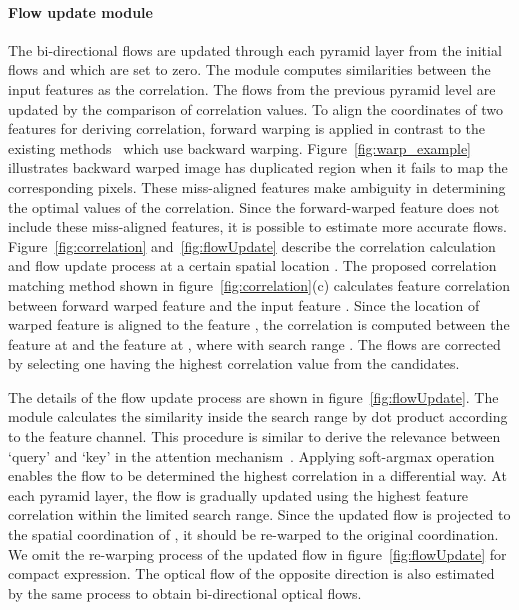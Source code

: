 \documentclass[10pt,twocolumn,letterpaper]{article}
\begin{document}
\label{section:flowupdatemodule}
\paragraph{Flow update module}
The bi-directional flows are updated through each pyramid layer from the initial flows  and  which are set to zero. 
The module computes similarities between the input features as the correlation.
The flows from the previous pyramid level are updated by the comparison of correlation values.
To align the coordinates of two features for deriving correlation, forward warping is applied in contrast to the existing methods~\cite{sun2018pwc, teed2020raft} which use backward warping.
Figure~\ref{fig:warp_example} illustrates backward warped image has duplicated region when it fails to map the corresponding pixels. 
These miss-aligned features make ambiguity in determining the optimal values of the correlation. 
Since the forward-warped feature does not include these miss-aligned features, it is possible to estimate more accurate flows.
Figure~\ref{fig:correlation} and~\ref{fig:flowUpdate} describe the correlation calculation and flow update process at a certain spatial location .
The proposed correlation matching method shown in figure~\ref{fig:correlation}(c) calculates feature correlation between forward warped feature  and the input feature . 
Since the location of warped feature  is aligned to the feature , the correlation is computed between the feature  at  and the feature  at , where  with search range . 
The flows are corrected by selecting one having the highest correlation value from the candidates.

The details of the flow update process are shown in figure~\ref{fig:flowUpdate}. 
The module calculates the similarity inside the search range by dot product according to the feature channel.
This procedure is similar to derive the relevance between `query' and `key' in the attention mechanism~\cite{vaswani2017attention}. 
Applying soft-argmax operation enables the flow to be determined the highest correlation in a differential way. 
At each pyramid layer, the flow is gradually updated using the highest feature correlation within the limited search range. 
Since the updated flow is projected to the spatial coordination of , it should be re-warped to the original coordination. 
We omit the re-warping process of the updated flow in figure~\ref{fig:flowUpdate} for compact expression. 
The optical flow of the opposite direction is also estimated by the same process to obtain bi-directional optical flows.
\end{document}
